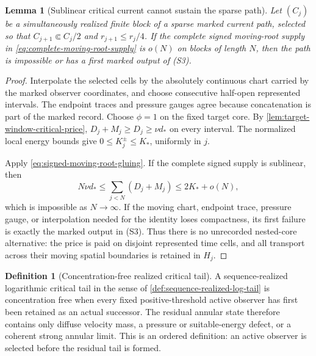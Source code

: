 \documentclass[11pt]{amsart}
\numberwithin{equation}{section}
\theoremstyle{plain}
\newtheorem{lemma}[lemma]{Lemma}
\theoremstyle{definition}
\newtheorem{definition}[definition]{Definition}
\theoremstyle{remark}
\begin{document}
\begin{lemma}[Sublinear critical current cannot sustain the sparse path]
\label{lem:sublinear-critical-current-closure}
Let \((C_j)\) be a simultaneously realized finite block of a sparse marked
current path, selected so that
\(C_{j+1}\Subset C_j/2\) and \(r_{j+1}\le r_j/4\).  If the complete signed
moving-root supply in \eqref{eq:complete-moving-root-supply} is \(o(N)\) on
blocks of length \(N\), then the path is impossible or has a first marked output of
\textup{(S3)}.
\end{lemma}

\begin{proof}
Interpolate the selected cells by the absolutely continuous chart carried by
the marked observer coordinates, and choose consecutive half-open represented
intervals.  The endpoint traces and pressure gauges agree because
concatenation is part of the marked record.  Choose \(\phi=1\) on the fixed
target core.  By \cref{lem:target-window-critical-price},
\(D_j+M_j\ge D_j\ge\nu d_*\) on every interval.  The normalized local energy
bounds give \(0\le K_j^\pm\le K_*\), uniformly in \(j\).

Apply \eqref{eq:signed-moving-root-gluing}.  If the complete signed supply is
sublinear, then
\[
 N\nu d_*
 \le\sum_{j<N}(D_j+M_j)
 \le2K_*+o(N),
\]
which is impossible as \(N\to\infty\).  If the moving chart, endpoint trace,
pressure gauge, or interpolation needed for the identity loses compactness,
its first failure is exactly the marked output in \textup{(S3)}.  Thus there
is no unrecorded nested-core alternative: the price is paid on disjoint
represented time cells, and all transport across their moving spatial
boundaries is retained in \(H_j\).
\end{proof}

\begin{definition}[Concentration-free realized critical tail]
\label{def:concentration-free-critical-tail}
A sequence-realized logarithmic critical tail in the sense of
\cref{def:sequence-realized-log-tail} is concentration free when every fixed
positive-threshold active observer has first been retained as an actual
successor.  The residual annular state therefore contains only diffuse
velocity mass, a pressure or suitable-energy defect, or a coherent strong
annular limit.  This is an ordered definition: an active observer is selected
before the residual tail is formed.
\end{definition}
\end{document}
